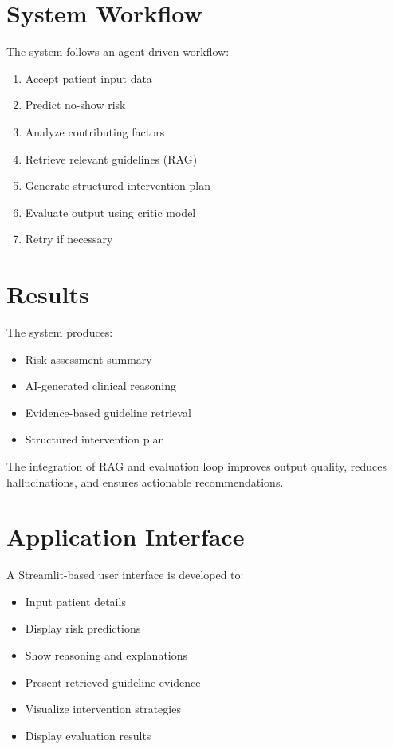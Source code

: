 \documentclass[12pt]{article}
\begin{document}

\section{System Workflow}

The system follows an agent-driven workflow:

\begin{enumerate}
    \item Accept patient input data
    \item Predict no-show risk
    \item Analyze contributing factors
    \item Retrieve relevant guidelines (RAG)
    \item Generate structured intervention plan
    \item Evaluate output using critic model
    \item Retry if necessary
\end{enumerate}


\section{Results}

The system produces:
\begin{itemize}
    \item Risk assessment summary
    \item AI-generated clinical reasoning
    \item Evidence-based guideline retrieval
    \item Structured intervention plan
\end{itemize}

The integration of RAG and evaluation loop improves output quality, reduces hallucinations, and ensures actionable recommendations.


\section{Application Interface}

A Streamlit-based user interface is developed to:
\begin{itemize}
    \item Input patient details
    \item Display risk predictions
    \item Show reasoning and explanations
    \item Present retrieved guideline evidence
    \item Visualize intervention strategies
    \item Display evaluation results
\end{itemize}
\end{document}
